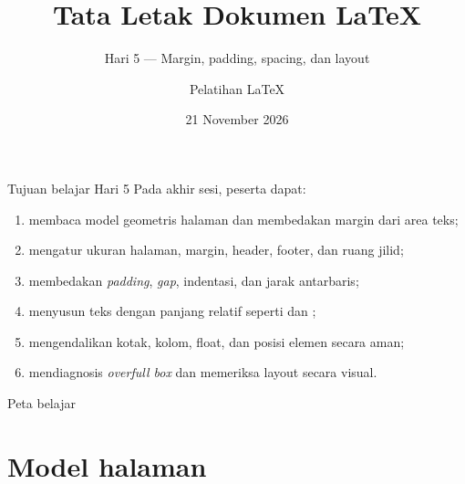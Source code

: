 \documentclass[aspectratio=169,11pt]{beamer}
\title{Tata Letak Dokumen \LaTeX}
\subtitle{Hari 5 --- Margin, padding, spacing, dan layout}
\author{Pelatihan LaTeX}
\date{21 November 2026}
\newcommand{\dimensi}[1]{\texttt{\detokenize{#1}}}
\begin{document}
\begin{frame}[plain]
  \titlepage
\end{frame}

\begin{frame}{Tujuan belajar Hari 5}
  Pada akhir sesi, peserta dapat:
  \begin{enumerate}
    \item membaca model geometris halaman dan membedakan margin dari area teks;
    \item mengatur ukuran halaman, margin, header, footer, dan ruang jilid;
    \item membedakan \emph{padding}, \emph{gap}, indentasi, dan jarak antarbaris;
    \item menyusun teks dengan panjang relatif seperti \dimensi{\textwidth} dan \dimensi{\linewidth};
    \item mengendalikan kotak, kolom, float, dan posisi elemen secara aman;
    \item mendiagnosis \emph{overfull box} dan memeriksa layout secara visual.
  \end{enumerate}
\end{frame}

\begin{frame}{Peta belajar}
  \tableofcontents
\end{frame}

\section{Model halaman}
\end{document}
